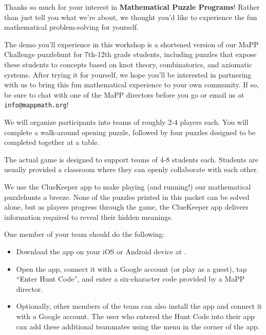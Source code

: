 \documentclass{puzzlehunt}
\title{\phEventName}
\author{Mathematical Puzzle Programs}
\date{\today}
\begin{document}

\phTitlePage


% 




Thanks so much for your interest in
\textbf{Mathematical Puzzle Programs}! Rather than
just tell you what we're about, we thought you'd like to
experience the fun mathematical problem-solving for yourself.

The demo you'll experience in this workshop is a shortened
version of our MaPP Challenge puzzlehunt for 7th-12th
grade students, including puzzles that expose these students
to concepts based on knot theory, combinatorics, and
axiomatic systems. After trying it for yourself, we hope
you'll be interested in partnering with us to bring this
fun mathematical experience to your own community.
If so, be sure to chat with one of the MaPP directors
before you go
or email us at \texttt{info@mappmath.org}! 


We will organize participants into teams of roughly
2-4 players each. You will complete a walk-around
opening puzzle, followed by four puzzles designed
to be completed together at a table.

The actual game is designed to support
teams of 4-8 students each. Students are usually
provided a classroom where they can openly collaborate
with each other.


We use the ClueKeeper app to make playing (and running!)
our mathematical puzzlehunts a breeze.
None of the puzzles printed in this packet can be
solved alone, but as players progress through the game,
the ClueKeeper app delivers information required
to reveal their hidden meanings.

One member of your team should do the following:

\begin{itemize}
\item Download the app on your iOS or Android device
  at . 
\item Open the app, connect it with a Google account
  (or play as a guest), tap ``Enter Hunt Code'', and enter
  a six-character code provided by a MaPP director.
\item Optionally, other members of the team can also install the
app and connect it with a Google account. The user who
entered the Hunt Code into their app can add these additional
teammates using the menu in the corner of the app.
\end{itemize}
\end{document}
